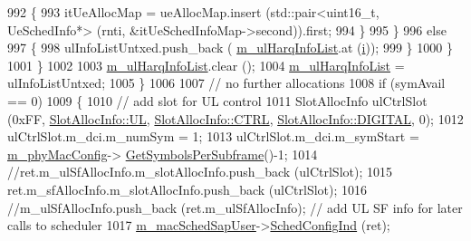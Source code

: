 \begin{DoxyCode}
992                                         \{
993                                                 itUeAllocMap = ueAllocMap.insert (std::pair<uint16\_t,
       UeSchedInfo*> (rnti, &itUeSchedInfoMap->second)).first;
994                                         \}
995                                 \}
996                                 \textcolor{keywordflow}{else}
997                                 \{
998                                         ulInfoListUntxed.push\_back (
      \hyperlink{classns3_1_1MmWaveFlexTtiMaxWeightMacScheduler_ad0c6ce6c255be4838fe693c7c1934598}{m\_ulHarqInfoList}.at (\hyperlink{bernuolliDistribution_8m_a6f6ccfcf58b31cb6412107d9d5281426}{i}));
999                                 \}
1000                         \}
1001                 \}
1002 
1003                 \hyperlink{classns3_1_1MmWaveFlexTtiMaxWeightMacScheduler_ad0c6ce6c255be4838fe693c7c1934598}{m\_ulHarqInfoList}.clear ();
1004                 \hyperlink{classns3_1_1MmWaveFlexTtiMaxWeightMacScheduler_ad0c6ce6c255be4838fe693c7c1934598}{m\_ulHarqInfoList} = ulInfoListUntxed;
1005         \}
1006 
1007         \textcolor{comment}{// no further allocations}
1008         \textcolor{keywordflow}{if} (symAvail == 0)
1009         \{
1010                 \textcolor{comment}{// add slot for UL control}
1011                 SlotAllocInfo ulCtrlSlot (0xFF, \hyperlink{structns3_1_1SlotAllocInfo_a6cad60db1d39034f1851e2cea625fe5da916b5be54594ead6ed677c570311cad2}{SlotAllocInfo::UL}, 
      \hyperlink{structns3_1_1SlotAllocInfo_a3ea7cb503bfd0c9a4df55a71b81b9331ad78b7d76ef82d56c33be1fa9c1867409}{SlotAllocInfo::CTRL}, \hyperlink{structns3_1_1SlotAllocInfo_adcbd067d82be6260b3399167d8f0b4eca47a67c342db658a08ded9ce4b49417ea}{SlotAllocInfo::DIGITAL}, 0);
1012                 ulCtrlSlot.m\_dci.m\_numSym = 1;
1013                 ulCtrlSlot.m\_dci.m\_symStart = \hyperlink{classns3_1_1MmWaveMacScheduler_a24d7af4971d2e500fe543cefbafa2fd9}{m\_phyMacConfig}->
      \hyperlink{classns3_1_1MmWavePhyMacCommon_a2fe835b76e3c689defa413e395cd10cb}{GetSymbolsPerSubframe}()-1;
1014                 \textcolor{comment}{//ret.m\_ulSfAllocInfo.m\_slotAllocInfo.push\_back (ulCtrlSlot);}
1015                 ret.m\_sfAllocInfo.m\_slotAllocInfo.push\_back (ulCtrlSlot);
1016                 \textcolor{comment}{//m\_ulSfAllocInfo.push\_back (ret.m\_ulSfAllocInfo); // add UL SF info for later calls to
       scheduler}
1017                 \hyperlink{classns3_1_1MmWaveFlexTtiMaxWeightMacScheduler_a4e443a317d7f5a4b2399043552cca5d5}{m\_macSchedSapUser}->\hyperlink{classns3_1_1MmWaveMacSchedSapUser_ac164dd52215c3924cf421b56089eece4}{SchedConfigInd} (ret);

\end{DoxyCode}
